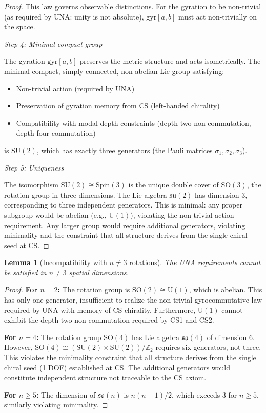 \documentclass[11pt,a4paper]{article}
\newtheorem{lemma}[theorem]{Lemma}
\theoremstyle{definition}
\theoremstyle{remark}
\begin{document}
\begin{proof}
This law governs observable distinctions. For the gyration to be non-trivial (as required by UNA: unity is not absolute), $\mathrm{gyr}[a,b]$ must act non-trivially on the space.

\textit{Step 4: Minimal compact group}

The gyration $\mathrm{gyr}[a,b]$ preserves the metric structure and acts isometrically. The minimal compact, simply connected, non-abelian Lie group satisfying:
\begin{itemize}
\item Non-trivial action (required by UNA)
\item Preservation of gyration memory from CS (left-handed chirality)
\item Compatibility with modal depth constraints (depth-two non-commutation, depth-four commutation)
\end{itemize}

is $\mathrm{SU}(2)$, which has exactly three generators (the Pauli matrices $\sigma_1, \sigma_2, \sigma_3$).

\textit{Step 5: Uniqueness}

The isomorphism $\mathrm{SU}(2) \cong \mathrm{Spin}(3)$ is the unique double cover of $\mathrm{SO}(3)$, the rotation group in three dimensions. The Lie algebra $\mathfrak{su}(2)$ has dimension 3, corresponding to three independent generators. This is minimal: any proper subgroup would be abelian (e.g., $\mathrm{U}(1)$), violating the non-trivial action requirement. Any larger group would require additional generators, violating minimality and the constraint that all structure derives from the single chiral seed at CS.
\end{proof}

\begin{lemma}[Incompatibility with $n \neq 3$ rotations]
The UNA requirements cannot be satisfied in $n \neq 3$ spatial dimensions.
\end{lemma}

\begin{proof}
\textbf{For $n = 2$:} The rotation group is $\mathrm{SO}(2) \cong \mathrm{U}(1)$, which is abelian. This has only one generator, insufficient to realize the non-trivial gyrocommutative law required by UNA with memory of CS chirality. Furthermore, $\mathrm{U}(1)$ cannot exhibit the depth-two non-commutation required by CS1 and CS2.

\textbf{For $n = 4$:} The rotation group $\mathrm{SO}(4)$ has Lie algebra $\mathfrak{so}(4)$ of dimension 6. However, $\mathrm{SO}(4) \cong (\mathrm{SU}(2) \times \mathrm{SU}(2))/\mathbb{Z}_2$ requires six generators, not three. This violates the minimality constraint that all structure derives from the single chiral seed (1 DOF) established at CS. The additional generators would constitute independent structure not traceable to the CS axiom.

\textbf{For $n \geq 5$:} The dimension of $\mathfrak{so}(n)$ is $n(n-1)/2$, which exceeds 3 for $n \geq 5$, similarly violating minimality.
\end{proof}
\end{document}
